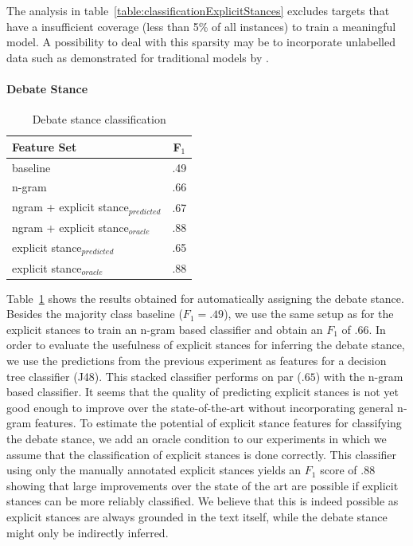 \documentclass[11pt]{article}
\begin{document}
The analysis in table~\ref{table:classificationExplicitStances} excludes targets that have a insufficient coverage (less than 5\% of all instances) to train a meaningful model.
A possibility to deal with this sparsity may be to incorporate unlabelled data such as demonstrated for traditional models by .

\paragraph{Debate Stance}

\begin{table}[]
\small
\centering
\begin{tabular}{lc}
\toprule
Feature Set    & F$_1$ \\
\midrule
baseline       & .49            \\[5pt]
n-gram          & .66             \\
ngram + explicit stance$_{predicted}$ & .67            \\
ngram + explicit stance$_{oracle}$ &  .88      \\
explicit stance$_{predicted}$ & .65  \\
explicit stance$_{oracle}$ & .88  \\
\bottomrule         
\end{tabular}
\caption{Debate stance classification}
\label{table:classificationDebateStances}
\end{table}

Table~\ref{table:classificationDebateStances} shows the results obtained for automatically assigning the debate stance.
Besides the majority class baseline ($F_1=.49$), we use the same setup as for the explicit stances to train an n-gram based classifier and obtain an $F_1$ of $.66$.
In order to evaluate the usefulness of explicit stances for inferring the debate stance, we use the predictions from the previous experiment as features for a decision tree classifier (J48).
This stacked classifier performs on par ($.65$) with the n-gram based classifier.
It seems that the quality of predicting explicit stances is not yet good enough to improve over the state-of-the-art without incorporating general n-gram features.
To estimate the potential of explicit stance features for classifying the debate stance, we add an oracle condition to our experiments in which we assume that the classification of explicit stances is done correctly.
This classifier using only the manually annotated explicit stances yields an $F_1$ score of $.88$ showing that large improvements over the state of the art are possible if explicit stances can be more reliably classified.
We believe that this is indeed possible as explicit stances are always grounded in the text itself, while the debate stance might only be indirectly inferred.
\end{document}
